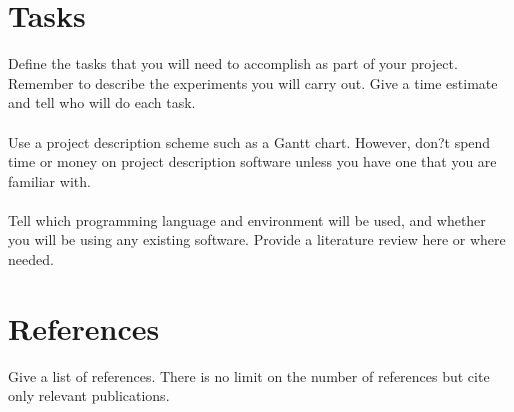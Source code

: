 \documentclass{article}
\begin{document}
\section {Tasks}
Define the tasks that you will need to accomplish as part of your project. Remember to describe the experiments you will carry out. Give a time estimate and tell who will do each task. \\ \\
Use a project description scheme such as a Gantt chart. However, don?t spend time or money on project description software unless you have one that you are familiar with. \\ \\
Tell which programming language and environment will be used, and whether you will be using
any existing software. Provide a literature review here or where needed.

\section {References}
Give a list of references. There is no limit on the number of references but cite only relevant publications.
\end{document}
